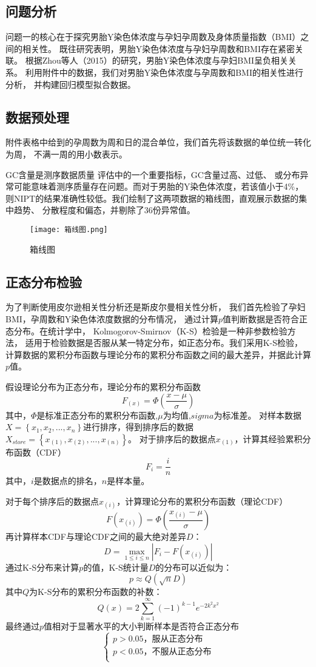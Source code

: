 \documentclass[withoutpreface,bwprint]{cumcmthesis} %
\begin{document}
\subsection{问题分析}
问题一的核心在于探究男胎Y染色体浓度与孕妇孕周数及身体质量指数（BMI）之间的相关性。
既往研究表明，男胎Y染色体浓度与孕妇孕周数和BMI存在紧密关联。
根据Zhou等人（2015）的研究，男胎Y染色体浓度与孕妇BMI呈负相关关系。
利用附件中的数据，我们对男胎Y染色体浓度与孕周数和BMI的相关性进行分析，
并构建回归模型拟合数据。
\subsection{数据预处理}
附件表格中给到的孕周数为周和日的混合单位，我们首先将该数据的单位统一转化为周，
不满一周的用小数表示。\par
GC含量是测序数据质量 评估中的一个重要指标，GC含量过高、过低、
或分布异常可能意味着测序质量存在问题。而对于男胎的Y染色体浓度，若该值小于4\%，
则NIPT的结果准确性较低。我们绘制了这两项数据的箱线图，直观展示数据的集中趋势、
分散程度和偏态，并剔除了36份异常值。
\begin{figure}[!h]
    \centering
    \texttt{[image: 箱线图.png]}
    \caption{箱线图}
    \label{fig1}
\end{figure}

\subsection{正态分布检验}
为了判断使用皮尔逊相关性分析还是斯皮尔曼相关性分析，
我们首先检验了孕妇BMI，孕周数和Y染色体浓度数据的分布情况，
通过计算$p$值判断数据是否符合正态分布。在统计学中，
Kolmogorov-Smirnov（K-S）检验是一种非参数检验方法，
适用于检验数据是否服从某一特定分布，如正态分布。我们采用K-S检验，
计算数据的累积分布函数与理论分布的累积分布函数之间的最大差异，并据此计算$p$值。
\par 假设理论分布为正态分布，理论分布的累积分布函数
$$
F_{\left( x \right)}=\varPhi \left( \frac{x-\mu}{\sigma} \right) 
$$
其中，$\varPhi$是标准正态分布的累积分布函数,$\mu$为均值,$sigma$为标准差。
对样本数据$X=\left\{ x_1,x_2,...,x_n \right\}$进行排序，得到排序后的数据
$X_{store}=\left\{ x_{\left( 1 \right)},x_{\left( 2 \right)},...,x_{\left( n \right)} \right\} $。
对于排序后的数据点$x_{\left( 1 \right)}$，计算其经验累积分布函数（CDF）
$$
F_i=\frac{i}{n}
$$
其中，$i$是数据点的排名，$n$是样本量。\par
对于每个排序后的数据点$x_{(i)}$，计算理论分布的累积分布函数（理论CDF）
$$
F(x_{(i)}) = \Phi \left( \frac{x_{(i)} - \mu}{\sigma} \right)
$$
再计算样本CDF与理论CDF之间的最大绝对差异$D$：
$$
D = \max_{1 \leq i \leq n} \left| F_i - F(x_{(i)}) \right|
$$
通过K-S分布来计算$p$的值，K-S统计量$D$的分布可以近似为：
$$
p \approx Q(\sqrt{n}D)
$$
其中$Q$为K-S分布的累积分布函数的补数：
$$
Q(x) = 2 \sum_{k=1}^{\infty} (-1)^{k-1} e^{-2k^2x^2}
$$
最终通过$p$值相对于显著水平的大小判断样本是否符合正态分布
$$
\left\{ \begin{array}{l}
	p>0.05\text{，服从正态分布}\\
	p<0.05\text{，不服从正态分布}\\
\end{array} \right. 
$$
\end{document}
